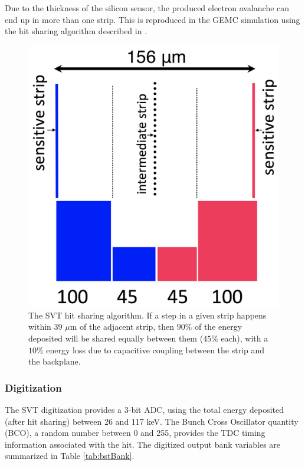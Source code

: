 Due to the thickness of the silicon sensor, the produced electron avalanche can end up in more than one strip. This
is reproduced in the GEMC simulation using the hit sharing algorithm described in .

\begin{figure}[t]
	\centering
	\includegraphics[width=0.99\columnwidth, height=0.65\columnwidth]{img/bstHitSharing.png}
	\caption{The SVT hit sharing algorithm. If a step in a given strip happens within 39 $\mu$m of the adjacent strip, then
             $90\%$ of the energy deposited will be shared equally between them ($45\%$ each), with a $10\%$ energy loss due
	         to capacitive coupling between the strip and the backplane.}
	\label{fig:bstHitSharing}
\end{figure}


\subsubsection{Digitization}

The SVT digitization provides a 3-bit ADC, using the total energy deposited (after hit sharing) between 26 and 117 keV.
The Bunch Cross Oscillator quantity (BCO), a random number between 0 and 255,
provides the TDC timing information associated with the hit.
The digitized output bank variables are summarized in Table \ref{tab:bstBank}.

